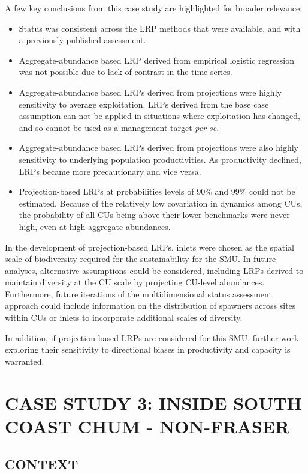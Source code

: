 \documentclass[11pt]{book}
\begin{document}
A few key conclusions from this case study are highlighted for broader relevance:
\begin{itemize}
\item
  Status was consistent across the LRP methods that were available, and with a previously published assessment.
\item
  Aggregate-abundance based LRP derived from empirical logistic regression was not possible due to lack of contrast in the time-series.
\item
  Aggregate-abundance based LRPs derived from projections were highly sensitivity to average exploitation. LRPs derived from the base case assumption can not be applied in situations where exploitation has changed, and so cannot be used as a management target \emph{per se}.
\item
  Aggregate-abundance based LRPs derived from projections were also highly sensitivity to underlying population productivities. As productivity declined, LRPs became more precautionary and vice versa.
\item
  Projection-based LRPs at probabilities levels of 90\% and 99\% could not be estimated. Because of the relatively low covariation in dynamics among CUs, the probability of all CUs being above their lower benchmarks were never high, even at high aggregate abundances.
\end{itemize}
In the development of projection-based LRPs, inlets were chosen as the spatial scale of biodiversity required for the sustainability for the SMU. In future analyses, alternative assumptions could be considered, including LRPs derived to maintain diversity at the CU scale by projecting CU-level abundances. Furthermore, future iterations of the multidimensional status assessment approach could include information on the distribution of spawners across sites within CUs or inlets to incorporate additional scales of diversity.

In addition, if projection-based LRPs are considered for this SMU, further work exploring their sensitivity to directional biases in productivity and capacity is warranted.

\hypertarget{ISCchumChapter}{%
\section{CASE STUDY 3: INSIDE SOUTH COAST CHUM - NON-FRASER}\label{ISCchumChapter}}

\hypertarget{context-2}{%
\subsection{CONTEXT}\label{context-2}}
\end{document}
